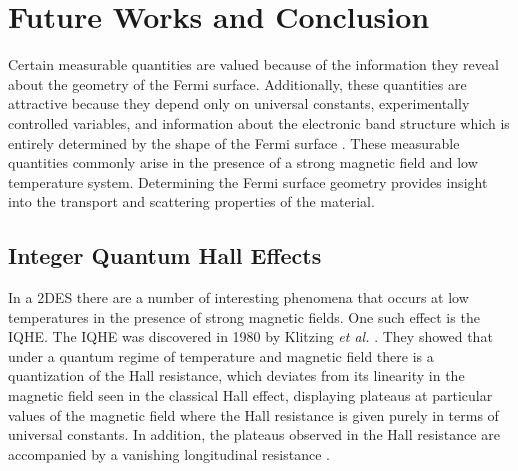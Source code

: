 \chapter{Future Works and Conclusion}\label{chap:conclusion}
Certain measurable quantities are valued because of the information they reveal about the geometry of the Fermi surface. Additionally, these quantities are attractive because they depend only on universal constants, experimentally controlled variables, and information about the electronic band structure which is entirely determined by the shape of the Fermi surface \cite{Ashcroft_SolidStatePhysics1978}. These measurable quantities commonly arise in the presence of a strong magnetic field and low temperature system. Determining the Fermi surface geometry provides insight into the transport and scattering properties of the material.

\section{Integer Quantum Hall Effects}\label{sec:IQHE}
In a \ac{2DES} there are a number of interesting phenomena that occurs at low temperatures in the presence of strong magnetic fields. One such effect is the \ac{IQHE}. The \acs{IQHE} was discovered in 1980 by Klitzing \emph{et al.} \cite{Klitzing_PhysRevLett1980}. They showed that under a quantum regime of temperature and magnetic field there is a quantization of the Hall resistance, which deviates from its linearity in the magnetic field seen in the classical Hall effect, displaying plateaus at particular values of the magnetic field where the Hall resistance is given purely in terms of universal constants. In addition, the plateaus observed in the Hall resistance are accompanied by a vanishing longitudinal resistance \cite{Klitzing_PhysRevLett1980,Ando_RevModPhys1982,Goerbig_2009,Hook_Solid1991}.\\ \\


